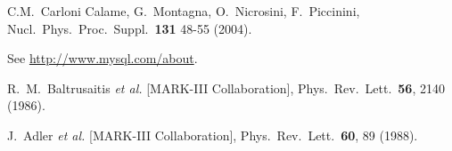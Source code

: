 \begin{thebibliography}{99}
  C.M.~Carloni Calame, G.~Montagna, O.~Nicrosini, F.~Piccinini,
  Nucl.\ Phys.\ Proc.\ Suppl.\ {\bf 131} 48-55 (2004).

  See \url{http://www.mysql.com/about}.

  R.~M.~Baltrusaitis {\it et al.}  [MARK-III Collaboration],
  Phys.\ Rev.\ Lett.\  {\bf 56}, 2140 (1986).

  J.~Adler {\it et al.}  [MARK-III Collaboration],
  Phys.\ Rev.\ Lett.\  {\bf 60}, 89 (1988).


\end{thebibliography}
